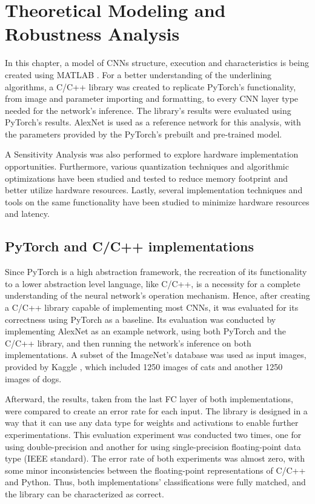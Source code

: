 \chapter{Theoretical Modeling and Robustness Analysis}

\label{Chapter-Robustness-Analysis}

In this chapter, a model of CNNs structure, execution and characteristics is being created using MATLAB \cite{MATLAB-Official-site}. For a better understanding of the underlining algorithms, a C/C++ library was created to replicate PyTorch's \cite{PyTorch-Official-site} functionality, from image and parameter importing and formatting, to every CNN layer type needed for the network's inference. The library's results were evaluated using PyTorch's results. AlexNet \cite{ImageNet-classification-with-deep-convolutional-neural-networks} is used as a reference network for this analysis, with the parameters provided by the PyTorch's prebuilt and pre-trained model.

A Sensitivity Analysis was also performed to explore hardware implementation opportunities. Furthermore, various quantization techniques and algorithmic optimizations have been studied and tested to reduce memory footprint and better utilize hardware resources. Lastly, several implementation techniques and tools on the same functionality have been studied to minimize hardware resources and latency.

\section{PyTorch and C/C++ implementations}
Since PyTorch is a high abstraction framework, the recreation of its functionality to a lower abstraction level language, like C/C++, is a necessity for a complete understanding of the neural network's operation mechanism. Hence, after creating a C/C++ library capable of implementing most CNNs, it was evaluated for its correctness using PyTorch as a baseline. Its evaluation was conducted by implementing AlexNet as an example network, using both PyTorch and the C/C++ library, and then running the network's inference on both implementations. A subset of the ImageNet's database was used as input images, provided by Kaggle \cite{Kaggle}, which included 1250 images of cats and another 1250 images of dogs.

Afterward, the results, taken from the last FC layer of both implementations, were compared to create an error rate for each input. The library is designed in a way that it can use any data type for weights and activations to enable further experimentations. This evaluation experiment was conducted two times, one for using double-precision and another for using single-precision floating-point data type (IEEE standard). The error rate of both experiments was almost zero, with some minor inconsistencies between the floating-point representations of C/C++ and Python. Thus, both implementations' classifications were fully matched, and the library can be characterized as correct.

